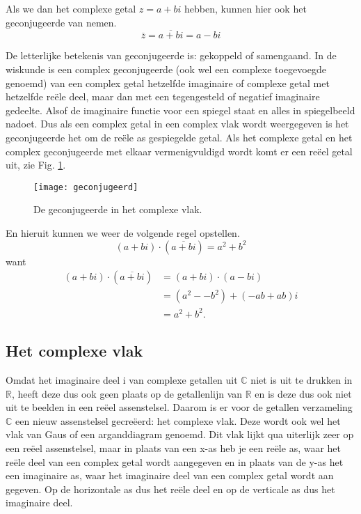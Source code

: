 \documentclass[11pt,fleqn]{book} %
\newcommand*\conj[1]{\overline{#1}}
\begin{document}
Als we dan het complexe getal $z = a + bi$ hebben, kunnen hier ook het geconjugeerde van nemen.
\begin{displaymath}
\conj{z}=\conj{a+bi}=a-bi
\end{displaymath}

De letterlijke betekenis van geconjugeerde is: gekoppeld of samengaand. In de wiskunde is een complex geconjugeerde (ook wel een complexe toegevoegde genoemd) van een complex getal hetzelfde imaginaire of complexe getal met hetzelfde reële deel, maar dan met een tegengesteld of negatief imaginaire gedeelte. Alsof de imaginaire functie voor een spiegel staat en alles in spiegelbeeld nadoet. Dus als een complex getal in een complex vlak wordt weergegeven is het geconjugeerde het om de reële as gespiegelde getal. Als het complexe getal en het complex geconjugeerde met elkaar vermenigvuldigd wordt komt er een reëel getal uit, zie Fig. \ref{fig:geconjugeerd}.

\begin{figure}[h]
	\centering\texttt{[image: geconjugeerd]}
	\caption{De geconjugeerde in het complexe vlak.}
	\label{fig:geconjugeerd}
\end{figure}

En hieruit kunnen we weer de volgende regel opstellen.
\begin{displaymath}
(a+bi)\cdot(\conj{a+bi})=a^2+b^2
\end{displaymath}
want
\begin{displaymath}
\begin{aligned}
(a+bi)\cdot(\conj{a+bi}) &= (a+bi)\cdot(a-bi)\\
&= (a^2--b^2)+(-ab+ab)i\\
&= a^2+b^2.
\end{aligned}
\end{displaymath}

\subsection{Het complexe vlak}
Omdat het imaginaire deel i van complexe getallen uit $\mathbb{C}$ niet is uit te drukken in $\mathbb{R}$, heeft deze dus ook geen plaats op de getallenlijn van $\mathbb{R}$ en is deze dus ook niet uit te beelden in een reëel assenstelsel. Daarom is er voor de getallen verzameling $\mathbb{C}$ een nieuw assenstelsel gecreëerd: het complexe vlak. Deze wordt ook wel het vlak van Gaus of een arganddiagram genoemd. Dit vlak lijkt qua uiterlijk zeer op een reëel assenstelsel, maar in plaats van een x-as heb je een reële as, waar het reële deel van een complex getal wordt aangegeven en in plaats van de y-as het een imaginaire as, waar het imaginaire deel van een complex getal wordt aan gegeven. Op de horizontale as dus het reële deel en op de verticale as dus het imaginaire deel.
\end{document}
